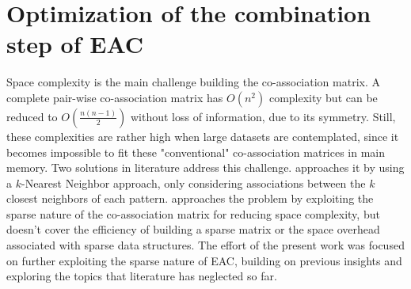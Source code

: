 

\section{Optimization of the combination step of EAC}
\label{sec:combination}

Space complexity is the main challenge building the co-association matrix.
A complete pair-wise co-association matrix has $O(n^2)$ complexity but can be reduced to $O(\frac{n(n-1)}{2})$ without loss of information, due to its symmetry.
Still, these complexities are rather high when large datasets are contemplated, since it becomes impossible to fit these "conventional" co-association matrices in main memory.
Two solutions in literature address this challenge.
\cite{Fred2005} approaches it by using a $k$-Nearest Neighbor approach, only considering associations between the $k$ closest neighbors of each pattern.
\cite{Lourenco2010} approaches the problem by exploiting the sparse nature of the co-association matrix for reducing space complexity, but doesn't cover the efficiency of building a sparse matrix or the space overhead associated with sparse data structures.
The effort of the present work was focused on further exploiting the sparse nature of EAC, building on previous insights and exploring the topics that literature has neglected so far.

